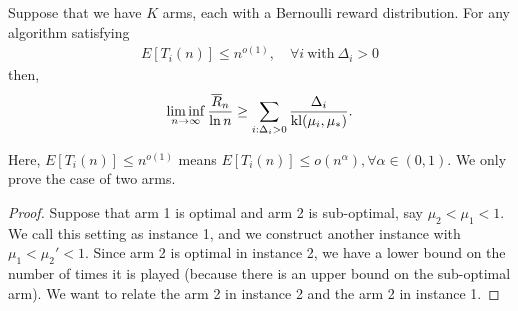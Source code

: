 \begin{thm}
    Suppose that we have $K$ arms,
    each with a Bernoulli reward distribution.
    For any algorithm satisfying
    \begin{align}
        E[T_i(n)] \le n^{o(1)}, \quad\forall i ~\text{with}~ \Delta_i>0
    \end{align}
    then,
    \begin{align}
        \liminf_{n\to\infty} \frac{{\overline{R}}_n}{\ln n} \ge \sum_{i:\Delta_i>0} \frac{\Delta_i}{{\mathop{\mathrm{kl}}}(\mu_i,\mu_*)}.
    \end{align}
\end{thm}
Here, $E[T_i(n)] \le n^{o(1)}$ means $E[T_i(n)] \le o(n^\alpha), \forall \alpha\in(0,1)$.
We only prove the case of two arms.
\begin{proof}
    Suppose that arm 1 is optimal and arm 2 is sub-optimal, say $\mu_2<\mu_1<1$.
    We call this setting as instance 1, and
    we construct another instance with $\mu_1<\mu_2'<1$.
    Since arm 2 is optimal in instance 2,
    we have a lower bound on the number of times it is played
    (because there is an upper bound on the sub-optimal arm).
    We want to relate the arm 2 in instance 2 and the arm 2 in instance 1.


\end{proof}
